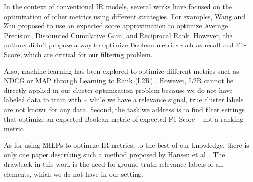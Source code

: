 In the context of conventional IR models, several works have focused on the optimization of other metrics using different strategies. 
For examples, Wang and Zhu \cite{Wang2010} proposed to use an expected score approximation to optimize Average Precision, Discounted Cumulative Gain, and Reciprocal Rank. However, the authors didn't propose a way to optimize Boolean metrics such as recall and F1-Score, which are critical for our filtering problem.

Also, machine learning has been explored to optimize different metrics such as NDCG or MAP through Learning to Rank (L2R) \cite{Baeza-Yates2010}. 
However, L2R cannot be directly applied in our cluster optimization problem because we do not have labeled data to train with -- while we have a relevance signal, true cluster labels are not known for any data.  Second, the task we address is to find filter settings that optimize an expected Boolean metric of expected F1-Score -- not a ranking metric.

As for using MILPs to optimize IR metrics, to the best of our knowledge, there is only one paper describing such a method proposed by Hansen et al~\cite{Hansen1991}. The drawback in this work is the need for ground truth relevance labels of all elements, which we do not have in our setting.






